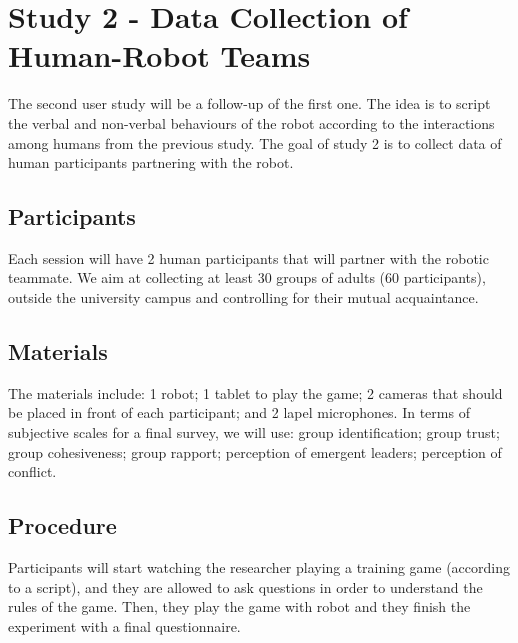 
\section{Study 2 - Data Collection of Human-Robot Teams}
\label{sec:fw-study2}
The second user study will be a follow-up of the first one. The idea is to script the verbal and non-verbal behaviours of the robot according to the interactions among humans from the previous study. The goal of study 2 is to collect data of human participants partnering with the robot.

\subsection{Participants}
Each session will have 2 human participants that will partner with the robotic teammate. We aim at collecting at least 30 groups of adults (60 participants), outside the university campus and controlling for their mutual acquaintance.

\subsection{Materials}
The materials include: 1 robot; 1 tablet to play the game; 2 cameras that should be placed in front of each participant; and 2 lapel microphones. In terms of subjective scales for a final survey, we will use: group identification\cite{leach2008group}; group trust\cite{allen2004exploring}; group cohesiveness\cite{hoegl2001teamwork}; group rapport\cite{lafrance1979nonverbal}; perception of emergent leaders; perception of conflict.

\subsection{Procedure}
Participants will start watching the researcher playing a training game (according to a script), and they are allowed to ask questions in order to understand the rules of the game. Then, they play the game with robot and they finish the experiment with a final questionnaire.

